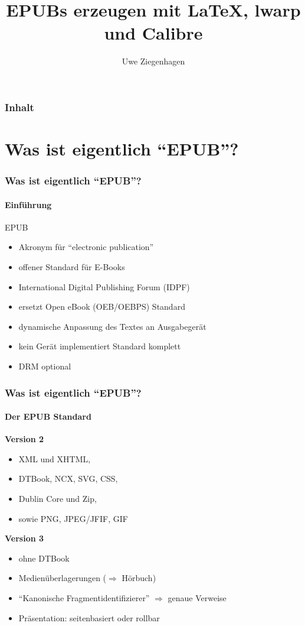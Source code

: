\documentclass[12pt,ngerman]{beamer}
\author{Uwe Ziegenhagen}
\title{EPUBs erzeugen mit LaTeX, lwarp und Calibre}
\begin{document}
\begin{frame}

\maketitle

\end{frame}

\begin{frame}
\frametitle{Inhalt}

\tableofcontents

\end{frame}

\section{Was ist eigentlich \enquote{EPUB}?}

\begin{frame}
\frametitle{Was ist eigentlich \enquote{EPUB}?}
\framesubtitle{Einführung}

EPUB

\begin{itemize}
\item Akronym für \enquote{electronic publication}
\item offener Standard für E-Books 
\item International Digital Publishing Forum (IDPF)
\item ersetzt Open eBook (OEB/OEBPS) Standard
\item dynamische Anpassung des Textes an Ausgabegerät
\item kein Gerät implementiert Standard komplett
\item DRM optional
\end{itemize}

\end{frame}

\begin{frame}
\frametitle{Was ist eigentlich \enquote{EPUB}?}
\framesubtitle{Der EPUB Standard}

\textbf{Version 2}

\begin{itemize}
\item XML und XHTML,
\item DTBook, NCX, SVG, CSS,
\item Dublin Core und Zip,
\item sowie PNG, JPEG/JFIF, GIF
\end{itemize}

\textbf{Version 3}

\begin{itemize}
	\item ohne DTBook
	\item Medienüberlagerungen ($\Rightarrow$ Hörbuch)
	\item \enquote{Kanonische Fragmentidentifizierer} $\Rightarrow$ genaue Verweise
	\item Präsentation: seitenbasiert oder rollbar
\end{itemize}

\end{frame}
\end{document}
